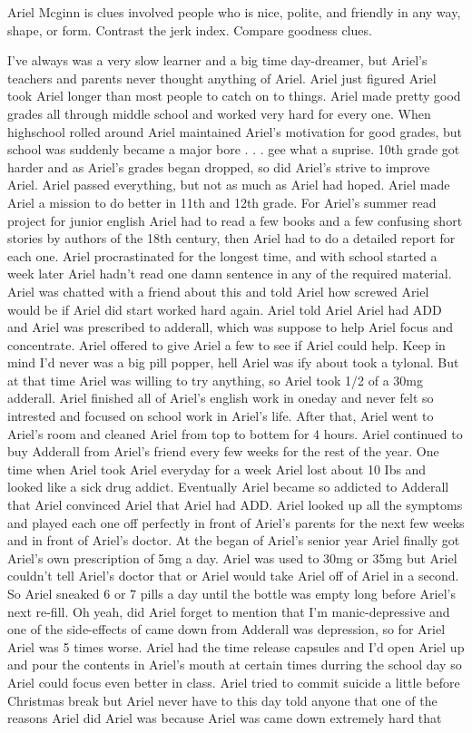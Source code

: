 \documentclass[12pt]{book}
\begin{document}
Ariel Mcginn is clues involved people who is nice, polite, and friendly in any way, shape, or form. Contrast the jerk index. Compare goodness clues.



I've always was a very slow learner and a big time day-dreamer, but Ariel's teachers and parents never thought anything of Ariel. Ariel just figured Ariel took Ariel longer than most people to catch on to things. Ariel made pretty good grades all through middle school and worked very hard for every one. When highschool rolled around Ariel maintained Ariel's motivation for good grades, but school was suddenly became a major bore . . .  gee what a suprise. 10th grade got harder and as Ariel's grades began dropped, so did Ariel's strive to improve Ariel. Ariel passed everything, but not as much as Ariel had hoped. Ariel made Ariel a mission to do better in 11th and 12th grade. For Ariel's summer read project for junior english Ariel had to read a few books and a few confusing short stories by authors of the 18th century, then Ariel had to do a detailed report for each one. Ariel procrastinated for the longest time, and with school started a week later Ariel hadn't read one damn sentence in any of the required material. Ariel was chatted with a friend about this and told Ariel how screwed Ariel would be if Ariel did start worked hard again. Ariel told Ariel Ariel had ADD and Ariel was prescribed to adderall, which was suppose to help Ariel focus and concentrate. Ariel offered to give Ariel a few to see if Ariel could help. Keep in mind I'd never was a big pill popper, hell Ariel was ify about took a tylonal. But at that time Ariel was willing to try anything, so Ariel took 1/2 of a 30mg adderall. Ariel finished all of Ariel's english work in oneday and never felt so intrested and focused on school work in Ariel's life. After that, Ariel went to Ariel's room and cleaned Ariel from top to bottem for 4 hours. Ariel continued to buy Adderall from Ariel's friend every few weeks for the rest of the year. One time when Ariel took Ariel everyday for a week Ariel lost about 10 Ibs and looked like a sick drug addict. Eventually Ariel became so addicted to Adderall that Ariel convinced Ariel that Ariel had ADD. Ariel looked up all the symptoms and played each one off perfectly in front of Ariel's parents for the next few weeks and in front of Ariel's doctor. At the began of Ariel's senior year Ariel finally got Ariel's own prescription of 5mg a day. Ariel was used to 30mg or 35mg but Ariel couldn't tell Ariel's doctor that or Ariel would take Ariel off of Ariel in a second. So Ariel sneaked 6 or 7 pills a day until the bottle was empty long before Ariel's next re-fill. Oh yeah, did Ariel forget to mention that I'm manic-depressive and one of the side-effects of came down from Adderall was depression, so for Ariel Ariel was 5 times worse. Ariel had the time release capsules and I'd open Ariel up and pour the contents in Ariel's mouth at certain times durring the school day so Ariel could focus even better in class. Ariel tried to commit suicide a little before Christmas break but Ariel never have to this day told anyone that one of the reasons Ariel did Ariel was because Ariel was came down extremely hard that 
\end{document}
